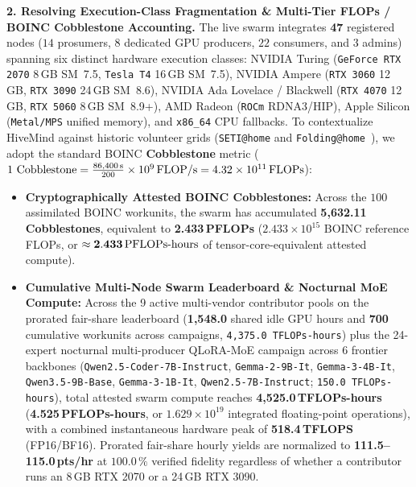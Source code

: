 \documentclass[11pt,a4paper]{article}
\begin{document}
\textbf{2. Resolving Execution-Class Fragmentation \& Multi-Tier FLOPs / BOINC Cobblestone Accounting.}
The live swarm integrates \textbf{47} registered nodes ($14$ prosumers, $8$ dedicated GPU producers, $22$ consumers, and $3$ admins) spanning six distinct hardware execution classes: NVIDIA Turing (\texttt{GeForce RTX 2070} 8\,GB SM~7.5, \texttt{Tesla T4} 16\,GB SM~7.5), NVIDIA Ampere (\texttt{RTX 3060} 12\,GB, \texttt{RTX 3090} 24\,GB SM~8.6), NVIDIA Ada Lovelace / Blackwell (\texttt{RTX 4070} 12\,GB, \texttt{RTX 5060} 8\,GB SM~8.9+), AMD Radeon (\texttt{ROCm} RDNA3/HIP), Apple Silicon (\texttt{Metal/MPS} unified memory), and \texttt{x86\_64} CPU fallbacks. To contextualize HiveMind against historic volunteer grids (\texttt{SETI@home} and \texttt{Folding@home}~\cite{anderson2002boinc}), we adopt the standard BOINC \textbf{Cobblestone} metric ($1\text{ Cobblestone} = \frac{86{,}400\text{\,s}}{200}\times 10^9\text{\,FLOP/s} = 4.32\times 10^{11}\text{\,FLOPs}$):
\begin{itemize}[leftmargin=1.8em]
    \item \textbf{Cryptographically Attested BOINC Cobblestones:} Across the $100$ assimilated BOINC workunits, the swarm has accumulated \textbf{5{,}632.11 Cobblestones}, equivalent to \textbf{2.433\,PFLOPs} ($2.433\times 10^{15}$ BOINC reference FLOPs, or $\approx \mathbf{2.433\text{\,PFLOPs-hours}}$ of tensor-core-equivalent attested compute).
    \item \textbf{Cumulative Multi-Node Swarm Leaderboard \& Nocturnal MoE Compute:} Across the 9 active multi-vendor contributor pools on the prorated fair-share leaderboard (\textbf{1{,}548.0} shared idle GPU hours and \textbf{700} cumulative workunits across campaigns, \texttt{4{,}375.0\,TFLOPs-hours}) plus the 24-expert nocturnal multi-producer QLoRA-MoE campaign across 6 frontier backbones (\texttt{Qwen2.5-Coder-7B-Instruct}, \texttt{Gemma-2-9B-It}, \texttt{Gemma-3-4B-It}, \texttt{Qwen3.5-9B-Base}, \texttt{Gemma-3-1B-It}, \texttt{Qwen2.5-7B-Instruct}; \texttt{150.0\,TFLOPs-hours}), total attested swarm compute reaches \textbf{4{,}525.0\,TFLOPs-hours} (\textbf{4.525\,PFLOPs-hours}, or $1.629\times 10^{19}$ integrated floating-point operations), with a combined instantaneous hardware peak of \textbf{518.4\,TFLOPS} (FP16/BF16). Prorated fair-share hourly yields are normalized to \textbf{111.5--115.0\,pts/hr} at $100.0\,\%$ verified fidelity regardless of whether a contributor runs an 8\,GB RTX 2070 or a 24\,GB RTX 3090.
\end{itemize}
\end{document}

